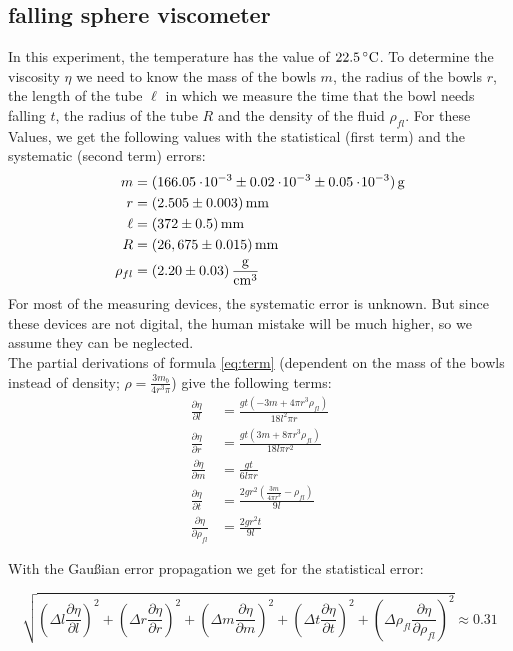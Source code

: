 \subsection{falling sphere viscometer}
In this experiment, the temperature has the value of $22.5\C$. To determine the viscosity $\eta$ we need to know the mass of the bowls $m$, the radius of the bowls $r$, the length of the tube $\ell$ in which we measure the time that the bowl needs falling $t$, the radius of the tube $R$ and the density of the fluid $\rho_{fl}$. For these Values, we get the following values with the statistical (first term) and the systematic (second term) errors:
\begin{align*}
m &= \unit[(166.05\e{-3} \pm 0.02 \e{-3} \pm 0.05\e{-3})]{g}\\
r &= \unit[(2.505 \pm 0.003)]{mm}\\
\ell &= \unit[(372 \pm 0.5)]{mm}\\
R &= \unit[(26,675 \pm 0.015)]{mm}\\
\rho_{fl} &= \unit[(2.20 \pm 0.03)]{\frac{g}{cm^3}}
\end{align*}
For most of the measuring devices, the systematic error is unknown. But since these devices are not digital, the human mistake will be much higher, so we assume they can be neglected. \\
The partial derivations of formula \ref{eq:term} (dependent on the mass of the bowls instead of density; $\rho = \frac{3m_b}{4r^3\pi}$) give the following terms:
\begin{align*}
\frac{\partial \eta}{\partial l}  &= \frac{g t \left(-3 m+4 \pi  r^3 \rho_{fl}\right)}{18 l^2 \pi  r}\\
\frac{\partial \eta}{\partial r} &= \frac{g t \left(3 m+8 \pi  r^3 \rho_{fl}\right)}{18 l \pi  r^2}\\
\frac{\partial \eta}{\partial m} &= \frac{g t}{6 l \pi  r}\\
\frac{\partial \eta}{\partial t} &= \frac{2 g r^2 \left(\frac{3 m}{4 \pi  r^3}- \rho_{fl}\right)}{9 l}\\
\frac{\partial \eta}{\partial \rho_{fl}} &= \frac{2 g r^2 t}{9 l}
\end{align*}

With the Gaußian error propagation we get for the statistical error:

\begin{equation}
\sqrt{
\left(\Delta l\frac{\partial \eta}{\partial l}\right)^2
+
\left(\Delta r\frac{\partial \eta}{\partial r}\right)^2
+
\left(\Delta m\frac{\partial \eta}{\partial m}\right)^2
+
\left(\Delta t\frac{\partial \eta}{\partial t}\right)^2
+
\left(\Delta \rho_{fl}\frac{\partial \eta}{\partial \rho_{fl}}\right)^2
} \approx 0.31
\end{equation}

